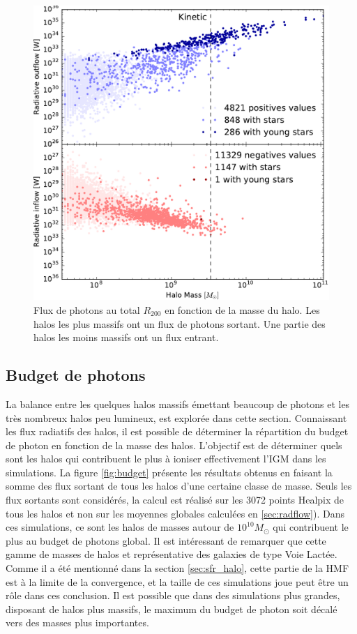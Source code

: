 \begin{figure}
	\includegraphics[height=.30\textheight]{img/03/flux_rad_kinetic.pdf} 
    \caption[Flux de photons au $R_{200}$]{Flux de photons au total $R_{200}$ en fonction de la masse du halo. 
    Les halos les plus massifs ont un flux de photons sortant. 
    Une partie des halos les moins massifs ont un flux entrant.}
 	\label{fig:R200rad}
\end{figure}


\subsection{Budget de photons}
\label{sec:photonbudget}
La balance entre les quelques halos massifs émettant beaucoup de photons et les très nombreux halos peu lumineux, est explorée dans cette section.
Connaissant les flux radiatifs des halos, il est possible de déterminer la répartition du budget de photon en fonction de la masse des halos.
L'objectif est de déterminer quels sont les halos qui contribuent le plus à ioniser effectivement l'\ac{IGM} dans les simulations.
La figure \ref{fig:budget} présente les résultats obtenus en faisant la somme des flux sortant de tous les halos d'une certaine classe de masse.
Seuls les flux sortants sont considérés, la calcul est réalisé sur les 3072 points Healpix de tous les halos et non sur les moyennes globales calculées en \ref{sec:radflow}).
Dans ces simulations, ce sont les halos de masses autour de $10^{10} M_\odot$ qui contribuent le plus au budget de photons global.
Il est intéressant de remarquer que cette gamme de masses de halos et représentative des galaxies de type Voie Lactée.
Comme il a été mentionné dans la section \ref{sec:sfr_halo}, cette partie de la \ac{HMF} est à la limite de la convergence, et la taille de ces simulations joue peut être un rôle dans ces conclusion.
Il est possible que dans des simulations plus grandes, disposant de halos plus massifs, le maximum du budget de photon soit décalé vers des masses plus importantes.


